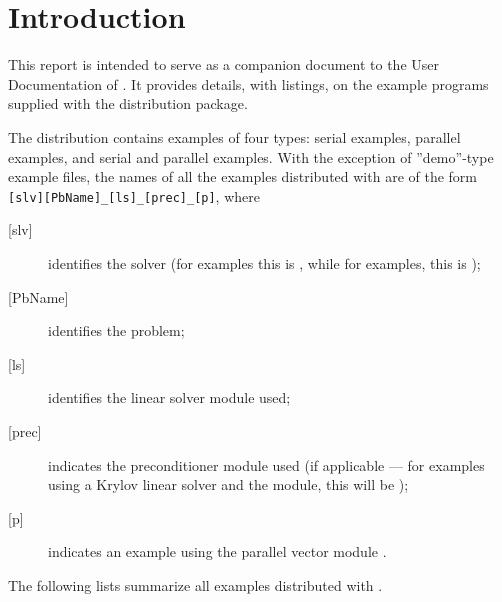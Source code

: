 \section{Introduction}\label{s:ex_intro}

This report is intended to serve as a companion document to the User
Documentation of {\ida} \cite{ida_ug}.  It provides details, with
listings, on the example programs supplied with the {\ida} distribution
package.

The {\ida} distribution contains examples of four types: serial
{\C} examples, parallel {\C} examples, and serial and parallel {\F}
examples.  
With the exception of ''demo''-type example files, the names of all the examples 
distributed with {\sundials} are of the form \verb![slv][PbName]_[ls]_[prec]_[p]!, 
where
\begin{description}
\item [{[slv]}] identifies the solver (for {\ida} examples this is , 
  while for {\fida} examples, this is );
\item [{[PbName]}] identifies the problem;
\item [{[ls]}] identifies the linear solver module used;
\item [{[prec]}] indicates the {\ida} preconditioner module used
  (if applicable --- for examples using a Krylov linear solver
  and the {\idabbdpre} module, this will be );
\item [{[p]}] indicates an example using the parallel vector module {\nvecp}.
\end{description}

\vspace{0.2in}\noindent
The following lists summarize all examples distributed with {\ida}.

